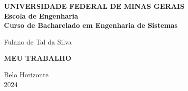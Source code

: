 \begin{center}
\textbf{UNIVERSIDADE FEDERAL DE MINAS GERAIS\\
Escola de Engenharia \\
Curso de Bacharelado em Engenharia de Sistemas}

\vspace{4cm}

Fulano de Tal da Silva

\vspace{4cm}  

{ \textbf{MEU TRABALHO} }

\vfill
{Belo Horizonte \\
2024 }
\end{center}